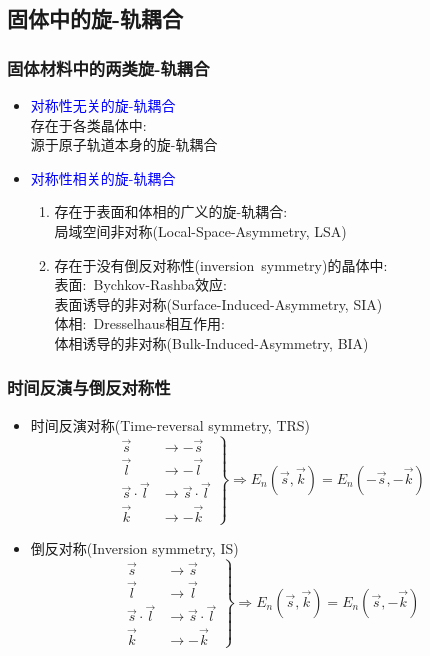 {\subsection{固体中的旋-轨耦合}
\frame
{
	\frametitle{固体材料中的两类旋-轨耦合}
	\begin{itemize}
		\item \textcolor{blue}{对称性无关的旋-轨耦合}\\
			存在于各类晶体中:\\
			源于原子轨道本身的旋-轨耦合
		\item \textcolor{blue}{对称性相关的旋-轨耦合}\\
			\begin{enumerate}
		\setlength{\itemsep}{5pt}
				\item 存在于表面和体相的广义的旋-轨耦合:\\
					局域空间非对称\textrm{(Local-Space-Asymmetry, LSA)}\\
				\item 存在于没有倒反对称性\textrm{(inversion~symmetry)}的晶体中:\\
			表面:~\textrm{Bychkov-Rashba}效应:\\
			表面诱导的非对称\textrm{(Surface-Induced-Asymmetry, SIA)}\\
			\vskip 4pt
			体相:~\textrm{Dresselhaus}相互作用:\\
			体相诱导的非对称\textrm{(Bulk-Induced-Asymmetry, BIA)}\\
			\end{enumerate}
	\end{itemize}
}

\frame
{
	\frametitle{时间反演与倒反对称性}
	\begin{itemize}
		\item 时间反演对称\textrm{(Time-reversal symmetry, TRS)}\\
			\begin{displaymath}
			\left.
				\begin{aligned}
					\vec s&\rightarrow -\vec s\\
					\vec l&\rightarrow -\vec l\\
					\vec s\cdot\vec l&\rightarrow \vec s\cdot\vec l\\
					\vec k&\rightarrow-\vec k
				\end{aligned}\right\}\Longrightarrow E_n(\vec s,\vec k)=E_n(-\vec s,-\vec k)
			\end{displaymath}
		\item 倒反对称\textrm{(Inversion symmetry, IS)}
			\begin{displaymath}
			\left.
				\begin{aligned}
					\vec s&\rightarrow \vec s\\
					\vec l&\rightarrow \vec l\\
					\vec s\cdot\vec l&\rightarrow \vec s\cdot\vec l\\
					\vec k&\rightarrow-\vec k
				\end{aligned}\right\}\Longrightarrow E_n(\vec s,\vec k)=E_n(\vec s,-\vec k)
			\end{displaymath}
	\end{itemize}
}

}
